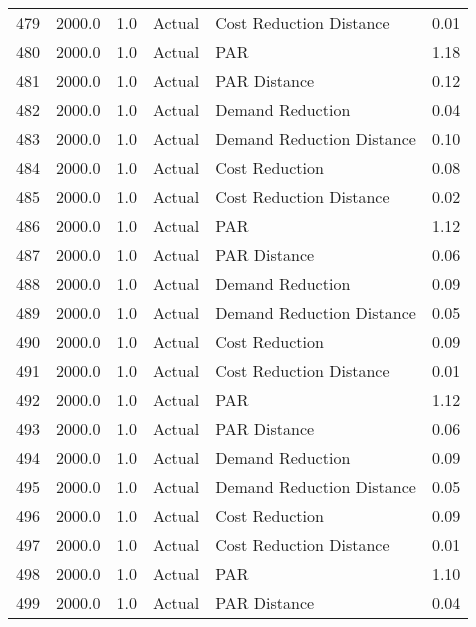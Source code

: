 \begin{longtable}{lrrllr}
479  &       2000.0 &     1.0 &         Actual &    Cost Reduction Distance &   0.01 \\
480  &       2000.0 &     1.0 &         Actual &                        PAR &   1.18 \\
481  &       2000.0 &     1.0 &         Actual &               PAR Distance &   0.12 \\
482  &       2000.0 &     1.0 &         Actual &           Demand Reduction &   0.04 \\
483  &       2000.0 &     1.0 &         Actual &  Demand Reduction Distance &   0.10 \\
484  &       2000.0 &     1.0 &         Actual &             Cost Reduction &   0.08 \\
485  &       2000.0 &     1.0 &         Actual &    Cost Reduction Distance &   0.02 \\
486  &       2000.0 &     1.0 &         Actual &                        PAR &   1.12 \\
487  &       2000.0 &     1.0 &         Actual &               PAR Distance &   0.06 \\
488  &       2000.0 &     1.0 &         Actual &           Demand Reduction &   0.09 \\
489  &       2000.0 &     1.0 &         Actual &  Demand Reduction Distance &   0.05 \\
490  &       2000.0 &     1.0 &         Actual &             Cost Reduction &   0.09 \\
491  &       2000.0 &     1.0 &         Actual &    Cost Reduction Distance &   0.01 \\
492  &       2000.0 &     1.0 &         Actual &                        PAR &   1.12 \\
493  &       2000.0 &     1.0 &         Actual &               PAR Distance &   0.06 \\
494  &       2000.0 &     1.0 &         Actual &           Demand Reduction &   0.09 \\
495  &       2000.0 &     1.0 &         Actual &  Demand Reduction Distance &   0.05 \\
496  &       2000.0 &     1.0 &         Actual &             Cost Reduction &   0.09 \\
497  &       2000.0 &     1.0 &         Actual &    Cost Reduction Distance &   0.01 \\
498  &       2000.0 &     1.0 &         Actual &                        PAR &   1.10 \\
499  &       2000.0 &     1.0 &         Actual &               PAR Distance &   0.04 \\

\end{longtable}
